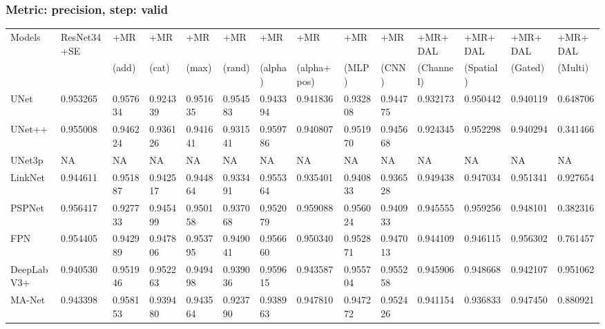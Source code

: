 \documentclass{article}
\begin{document}
\subsubsection{Metric: precision, step: valid}
\begin{tabular}{llllllllllllll}
\toprule
Models & ResNet34+SE & +MR  & +MR  & +MR  & +MR  & +MR  & +MR  & +MR  & +MR  & +MR+DAL & +MR+DAL & +MR+DAL & +MR+DAL \\
       &             &  (add) &  (cat) &  (max) &  (rand) &  (alpha) &  (alpha+pos) &  (MLP) &  (CNN) & (Channel) & (Spatial) & (Gated) & (Multi) \\
\midrule
UNet & 0.953265 & 0.957634 & 0.924339 & 0.951635 & 0.954583 & 0.943394 & 0.941836 & 0.932808 & 0.944775 & 0.932173 & 0.950442 & 0.940119 & 0.648706 \\
UNet++ & 0.955008 & 0.946224 & 0.936126 & 0.941641 & 0.931541 & 0.959786 & 0.940807 & 0.951970 & 0.945668 & 0.924345 & 0.952298 & 0.940294 & 0.341466 \\
UNet3p & NA & NA & NA & NA & NA & NA & NA & NA & NA & NA & NA & NA & NA \\
LinkNet & 0.944611 & 0.951887 & 0.942517 & 0.944864 & 0.933491 & 0.955364 & 0.935401 & 0.940833 & 0.936528 & 0.949438 & 0.947034 & 0.951341 & 0.927654 \\
PSPNet & 0.956417 & 0.927733 & 0.945499 & 0.950158 & 0.937068 & 0.952079 & 0.959088 & 0.956024 & 0.940933 & 0.945555 & 0.959256 & 0.948101 & 0.382316 \\
FPN & 0.954405 & 0.942989 & 0.947806 & 0.953795 & 0.949041 & 0.956660 & 0.950340 & 0.952871 & 0.947013 & 0.944109 & 0.946115 & 0.956302 & 0.761457 \\
DeepLabV3+ & 0.940530 & 0.951946 & 0.952263 & 0.949498 & 0.939036 & 0.959615 & 0.943587 & 0.955704 & 0.955258 & 0.945906 & 0.948668 & 0.942107 & 0.951062 \\
MA-Net & 0.943398 & 0.958153 & 0.939480 & 0.943564 & 0.923790 & 0.938963 & 0.947810 & 0.947272 & 0.952426 & 0.941154 & 0.936833 & 0.947450 & 0.880921 \\
\bottomrule
\end{tabular}
\end{document}

